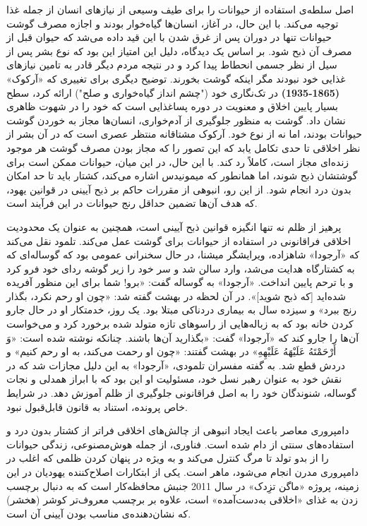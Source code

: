 اصل سلطه‌ی استفاده از حیوانات را برای طیف وسیعی از نیازهای انسان از جمله غذا توجیه می‌کند.
با این حال، در آغاز، انسان‌ها گیاه‌خوار بودند و اجازه مصرف گوشت حیوانات تنها در دوران پس از غرق شدن با این قید داده می‌شد که حیوان قبل از مصرف آن ذبح شود.
بر اساس یک دیدگاه، دلیل این امتیاز این بود که نوع بشر پس از سیل از نظر جسمی انحطاط پیدا کرد و در نتیجه مردم دیگر قادر به تامین نیازهای غذایی خود نبودند مگر اینکه گوشت بخورند.
توضیح دیگری برای تغییری که «آرکوک» \textenglish{\textbf{(1865-1935)}} در تک‌نگاری خود ("چشم انداز گیاه‌خواری و صلح") ارائه کرد، سطح بسیار پایین اخلاق و معنویت در دوره پساغذایی است که خود را در شهوت ظاهری نشان داد.
گوشت به منظور جلوگیری از آدم‌خواری، انسان‌ها مجاز به خوردن گوشت حیوانات بودند، اما نه از نوع خود.
آرکوک مشتاقانه منتظر عصری است که در آن بشر از نظر اخلاقی تا حدی تکامل یابد که این تصور را که مجاز بودن مصرف گوشت هر موجود زنده‌ای مجاز است، کاملاً رد کند.
با این حال، در این میان، حیوانات ممکن است برای گوشتشان ذبح شوند، اما همانطور که میمونیدس اشاره می‌کند، کشتار باید تا حد امکان بدون درد انجام شود.
از این رو، انبوهی از مقررات حاکم بر ذبح آیینی در قوانین یهود، که هدف آن‌ها تضمین حداقل رنج حیوانات در این فرآیند است.

پرهیز از ظلم نه تنها انگیزه قوانین ذبح آیینی است، همچنین به عنوان یک محدودیت اخلاقی فراقانونی در استفاده از حیوانات برای گوشت عمل می‌کند.
تلمود نقل می‌کند که «آرجودا» شاهزاده، ویرایشگر میشنا، در حال سخنرانی عمومی بود که گوساله‌ای که به کشتارگاه هدایت می‌شد، وارد سالن شد و سر خود را زیر گوشه ردای خود فرو کرد و با ترحم پایین انداخت.
«آرجودا» به گوساله گفت: «برو!
شما برای این منظور آفریده شده‌اید [که ذبح شوید]».
در آن لحظه در بهشت گفته شد: «چون او رحم نکرد، بگذار رنج ببرد» و سیزده سال به بیماری دردناکی مبتلا بود.
یک روز، خدمتکار او در حال جارو کردن خانه بود که به زباله‌هایی از راسوهای تازه متولد شده برخورد کرد و می‌خواست آن‌ها را جارو کند که «آرجودا» گفت: «بگذارید آن‌ها باشند.
چنانکه نوشته شده است: «وَ أَرْحَمْتَهُ عَلَیْهَهُ عَلَیْهِهِ» در بهشت گفتند: «چون او رحمت می‌کند، به او رحم کنیم» و دردش قطع شد.
به گفته مفسران تلمودی، «آرجودا» به این دلیل مجازات شد که در نقش خود به عنوان رهبر نسل خود، مسئولیت او این بود که با ابراز همدلی و نجات گوساله، شنوندگان خود را به اصل فراقانونی جلوگیری از ظلم آموزش دهد.
در شرایط خاص پرونده، استناد به قانون قابل‌قبول نبود.

دامپروری معاصر باعث ایجاد انبوهی از چالش‌های اخلاقی فراتر از کشتار بدون درد و استفاده‌های سنتی از دام شده است.
فناوری، از جمله هوش‌مصنوعی، زندگی حیوانات را از بدو تولد تا مرگ کنترل می‌کند و به ویژه در پنهان کردن ظلمی که اغلب در دامپروری مدرن انجام می‌شود، ماهر است.
یکی از ابتکارات اصلاح‌کننده یهودیان در این زمینه، پروژه «ماگن تزِدک» در سال 2011 جنبش محافظه‌کار است که به دنبال برچسب زدن به غذای «اخلاقی به‌دست‌آمده» است، علاوه بر برچسب معروف‌تر کوشر (هخشر) که نشان‌دهنده‌ی مناسب بودن آیینی آن است.
\newline
\newline



